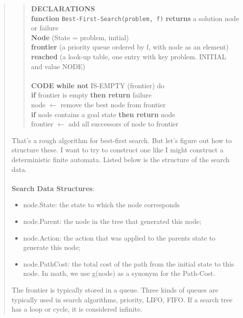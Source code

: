 \documentclass{article}
\begin{document}
\begin{quote}
    \begin{quote}
        \textbf{DECLARATIONS} \\
        \textbf{function} \texttt{Best-First-Search(problem, f)} \textbf{returns} a solution node or failure
        \\\textbf{Node} (State = problem, initial)
        \\ \textbf{frontier} (a priority queue ordered by f, with node as an element) \\ \textbf{reached} (a look-up table, one entry with key problem. INITIAL and value NODE)
        \\ \\
        \textbf{CODE}
        \textbf{while not} IS-EMPTY (frontier) do \\
        \hspace*{1em} \textbf{if} frontier is empty \textbf{then return} failure \\
        \hspace*{1em} node $\gets$ remove the best node from frontier \\
        \hspace*{1em} \textbf{if} node contains a goal state \textbf{then return} node \\
        \hspace*{1em} frontier $\gets$ add all successors of node to frontier
    \end{quote}
    That's a rough algorithm for best-first search. But let's figure out how to structure these. I want to try to construct one like I might construct a deterministic finite automata. Listed below is the
    structure of the search data. \\
    \\ \textbf{Search Data Structures}:
    \begin{itemize}
        \item node.State: the state to which the node corresponds
        \item node.Parent: the node in the tree that generated this node;
        \item node.Action: the action that was applied to the parents state to generate this node;
        \item node.PathCost: the total cost of the path from the initial state to this node. In math, we use g(node) as a synonym for the Path-Cost.
    \end{itemize}
    The frontier is typically stored in a queue. Three kinds of queues are typically used in search algorithms, priority, LIFO, FIFO. If a search tree has a loop or cycle, it is considered infinite.
\end{quote}
\end{document}
